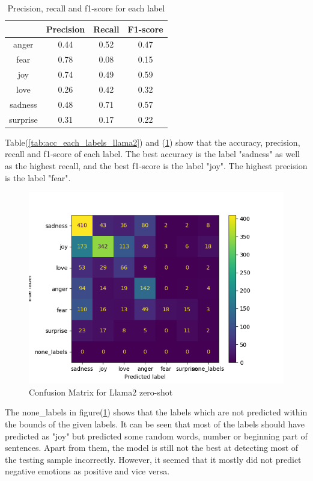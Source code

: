 \begin{table}[h!]
    \centering
    \begin{tabular}{c|c|c|c}
         & Precision & Recall & F1-score\\\hline
         anger & 0.44 & 0.52 & 0.47 \\
         fear & 0.78 & 0.08 &  0.15 \\
         joy & 0.74 & 0.49 & 0.59 \\
         love & 0.26 & 0.42 & 0.32\\
         sadness & 0.48 & 0.71 & 0.57\\
         surprise & 0.31 & 0.17 & 0.22\\
    \end{tabular}
    \caption{Precision, recall and f1-score for each label}
    \label{tab:class_rep_llama2}
\end{table}
\bigskip
\bigskip
\bigskip
\bigskip
\bigskip
\bigskip
\bigskip
Table(\ref{tab:acc_each_labels_llama2}) and (\ref{tab:class_rep_llama2}) show that the accuracy, precision, recall and f1-score of each label. The best accuracy is the label "sadness" as well as the highest recall, and the best f1-score is the label "joy". The highest precision is the label "fear".

\begin{figure}[h!]
    \centerline{\includegraphics[scale=0.6]{Figures/conf_metrix_llama2_no_epochs.png}}
    \caption{Confusion Matrix for Llama2 zero-shot}
    \label{fig:conf_matrix_llama2}
\end{figure}

The none\_labels in figure(\ref{fig:conf_matrix_llama2}) shows that the labels which are not predicted within the bounds of the given labels. It can be seen that most of the labels should have predicted as "joy" but predicted some random words, number or beginning part of sentences. Apart from them, the model is still not the best at detecting most of the testing sample incorrectly. However, it seemed that it mostly did not predict negative emotions as positive and vice versa.